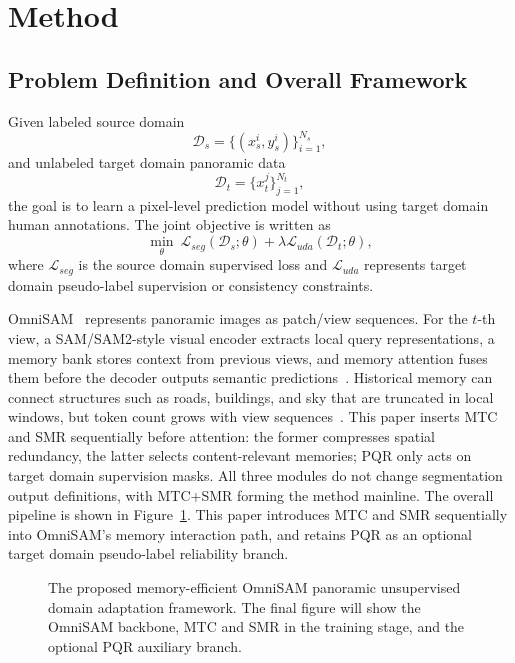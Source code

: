 \section{Method}
\label{sec:method}

\subsection{Problem Definition and Overall Framework}
Given labeled source domain
\[
\mathcal{D}_s=\{(x_s^i,y_s^i)\}_{i=1}^{N_s},
\]
and unlabeled target domain panoramic data
\[
\mathcal{D}_t=\{x_t^j\}_{j=1}^{N_t},
\]
the goal is to learn a pixel-level prediction model without using target domain human annotations. The joint objective is written as
\[
\min_{\theta}\ \mathcal{L}_{seg}(\mathcal{D}_s;\theta)+\lambda\mathcal{L}_{uda}(\mathcal{D}_t;\theta),
\]
where $\mathcal{L}_{seg}$ is the source domain supervised loss and $\mathcal{L}_{uda}$ represents target domain pseudo-label supervision or consistency constraints.

OmniSAM~\cite{zhong2025omnisam} represents panoramic images as patch/view sequences. For the $t$-th view, a SAM/SAM2-style visual encoder extracts local query representations, a memory bank stores context from previous views, and memory attention fuses them before the decoder outputs semantic predictions~\cite{kirillov2023segment,ravi2025sam2}. Historical memory can connect structures such as roads, buildings, and sky that are truncated in local windows, but token count grows with view sequences~\cite{rao2021dynamicvit,bolya2023tome,lu2023tokensharing}. This paper inserts MTC and SMR sequentially before attention: the former compresses spatial redundancy, the latter selects content-relevant memories; PQR only acts on target domain supervision masks. All three modules do not change segmentation output definitions, with MTC+SMR forming the method mainline. The overall pipeline is shown in Figure~\ref{fig:overall_pipeline}. This paper introduces MTC and SMR sequentially into OmniSAM's memory interaction path, and retains PQR as an optional target domain pseudo-label reliability branch.

\begin{figure}[t]
    \centering
    \caption{The proposed memory-efficient OmniSAM panoramic unsupervised domain adaptation framework. The final figure will show the OmniSAM backbone, MTC and SMR in the training stage, and the optional PQR auxiliary branch.}
    \label{fig:overall_pipeline}
\end{figure}

